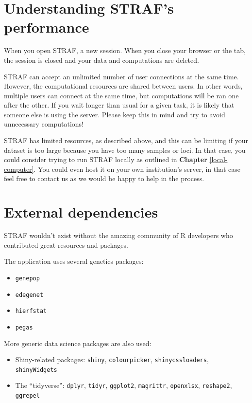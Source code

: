 \documentclass[
]{book}
\begin{document}
\hypertarget{understanding-strafs-performance}{%
\section{Understanding STRAF's performance}\label{understanding-strafs-performance}}

When you open STRAF, a new session. When you close your browser or the tab,
the session is closed and your data and computations are deleted.

STRAF can accept an unlimited number of user connections at the same time.
However, the computational resources are shared between users. In other words,
multiple users can connect at the same time, but computations will be ran one after
the other. If you wait longer than usual for a given task, it is likely
that someone else is using the server. Please keep this in mind and try to avoid
unnecessary computations!

STRAF has limited resources, as described above, and this can be limiting if your
dataset is too large because you have too many samples or loci. In that case,
you could consider trying to run STRAF locally as outlined in \textbf{Chapter} \ref{local-computer}. You could even host it on your own institution's server, in that
case feel free to contact us as we would be happy to help in the process.

\hypertarget{external-dependencies}{%
\section{External dependencies}\label{external-dependencies}}

STRAF wouldn't exist without the amazing community of R developers who contributed
great resources and packages.

The application uses several genetics packages:

\begin{itemize}
\item
  \texttt{genepop}
\item
  \texttt{edegenet}
\item
  \texttt{hierfstat}
\item
  \texttt{pegas}
\end{itemize}

More generic data science packages are also used:

\begin{itemize}
\item
  Shiny-related packages: \texttt{shiny}, \texttt{colourpicker}, \texttt{shinycssloaders}, \texttt{shinyWidgets}
\item
  The ``tidyverse'': \texttt{dplyr}, \texttt{tidyr}, \texttt{ggplot2}, \texttt{magrittr}, \texttt{openxlsx}, \texttt{reshape2}, \texttt{ggrepel}
\end{itemize}
\end{document}
